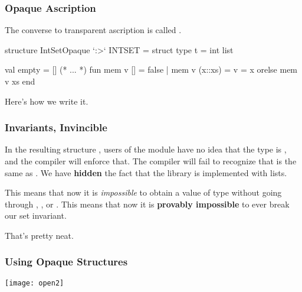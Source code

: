 \documentclass[aspectratio=169, handout]{beamer}
\begin{document}
\begin{frame}[fragile]
  \frametitle{Opaque Ascription}

  The converse to transparent ascription is called .

  \pause
  \vspace{\fill}


  \pause
  \begin{codeblock}
    structure IntSetOpaque `:>` INTSET =
      struct
        type t = int list

        val empty = []
        (* ... *)
        fun mem v [] = false
          | mem v (x::xs) = v = x orelse mem v xs
      end
  \end{codeblock}

  Here's how we write it.
\end{frame}

\begin{frame}[fragile]
  \frametitle{Invariants, Invincible}

  \tgs

  In the resulting structure , users of the module have
  no idea that the type  is , and the compiler will
  enforce that. The compiler will fail to recognize that 
  is the same as . We have \textbf{hidden} the fact that the
   library is implemented with lists.

  \pause
  \vspace{\fill}

  This means that now it is \textit{impossible} to obtain a value of type
   without going through ,
  , or . This means that
  now it is \textbf{provably impossible} to ever break our set invariant.

  \pause
  \vspace{\fill}

  That's pretty neat.
\end{frame}

\begin{frame}[fragile]
  \frametitle{Using Opaque Structures}

  \begin{center}
    \texttt{[image: open2]}
  \end{center}
\end{frame}
\end{document}
